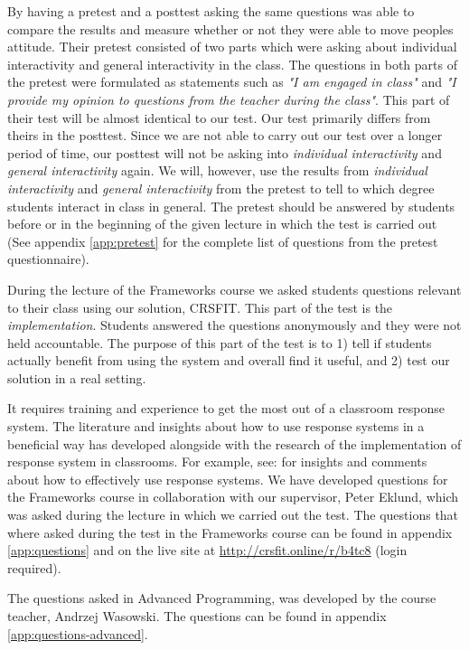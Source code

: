 By having a pretest and a posttest asking the same questions  was able to compare the results and measure whether or not they were able to move peoples attitude. Their pretest consisted of two parts which were asking about individual interactivity and general interactivity in the class. The questions in both parts of the pretest were formulated as statements such as \emph{"I am engaged in class"} and \emph{"I provide my opinion to questions from the teacher during the class"}. This part of their test will be almost identical to our test. Our test primarily differs from theirs in the posttest. Since we are not able to carry out our test over a longer period of time, our posttest will not be asking into \emph{individual interactivity} and \emph{general interactivity} again. We will, however, use the results from \emph{individual interactivity} and \emph{general interactivity} from the pretest to tell to which degree students interact in class in general. The pretest should be answered by students before or in the beginning of the given lecture in which the test is carried out (See appendix \ref{app:pretest} for the complete list of questions from the pretest questionnaire).

During the lecture of the Frameworks course we asked students questions relevant to their class using our solution, CRSFIT. This part of the test is the \emph{implementation}. Students answered the questions anonymously and they were not held accountable. The purpose of this part of the test is to 1) tell if students actually benefit from using the system and overall find it useful, and 2) test our solution in a real setting.

It requires training and experience to get the most out of a classroom response system. The literature and insights about how to use response systems in a beneficial way has developed alongside with the research of the implementation of response system in classrooms. For example, see: \cite{lantz2014effectiveness,draper2004increasing,lin2011implementing} for insights and comments about how to effectively use response systems. 
We have developed questions for the Frameworks course in collaboration with our supervisor, Peter Eklund, which was asked during the lecture in which we carried out the test.
The questions that where asked during the test in the Frameworks course can be found in appendix \ref{app:questions} and on the live site at \url{http://crsfit.online/r/b4tc8} (login required). 

The questions asked in Advanced Programming, was developed by the course teacher, Andrzej Wasowski. The questions can be found in appendix \ref{app:questions-advanced}.


